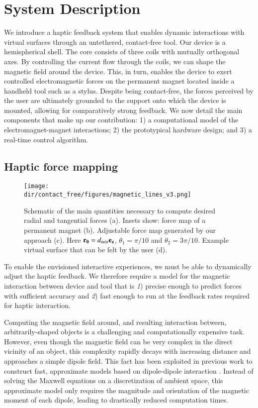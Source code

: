 \section{System Description}

We introduce a haptic feedback system that enables dynamic interactions with virtual surfaces through an untethered, contact-free tool.
Our device is a hemispherical shell. The core consists of three coils with mutually orthogonal axes. By controlling the current flow through the coils, we can shape the magnetic field around the device. This, in turn, enables the device to exert controlled electromagnetic forces on the permanent magnet located inside a handheld tool such as a stylus. Despite being contact-free, the forces perceived by the user are ultimately grounded to the support onto which the device is mounted, allowing for comparatively strong feedback.
We now detail the main components that make up our contribution: 1) a computational model of the electromagnet-magnet interactions; 2) the prototypical hardware design; and 3) a real-time control algorithm.

\subsection{Haptic force mapping}
\begin{figure}[t]
\centering
\medskip
\texttt{[image: \\dir/contact\_free/figures/magnetic\_lines\_v3.png]}
\caption{Schematic of the main quantities necessary to compute desired radial and tangential forces (a). Insets show: force map of a permanent magnet (b). Adjustable force map generated by our approach (c). Here $\mathbf{r_{0}} = d_{min} \mathbf{e_z}$, $\theta_1 = \pi/10$ and $\theta_2 = 3\pi/10$. Example virtual surface that can be felt by the user (d).}
\label{fig:magnetic_model}
\end{figure}{}

To enable the envisioned interactive experiences, we must be able to dynamically adjust the haptic feedback. We therefore require a model for the magnetic interaction between device and tool that is \emph{1}) precise enough to predict forces with sufficient accuracy and \emph{2}) fast enough to run at the feedback rates required for haptic interaction.

Computing the magnetic field around, and resulting interaction between, arbitrarily-shaped objects is a challenging and computationally expensive task. However, even though the magnetic field can be very complex in the direct vicinity of an object, this complexity rapidly decays with increasing distance and approaches a simple dipole field. This fact has been exploited in previous work to construct fast, approximate models based on dipole-dipole interaction \cite{thomaszewski2008magnets}. Instead of solving the Maxwell equations on a discretization of ambient space, this approximate model only requires the magnitude and orientation of the magnetic moment of each dipole, leading to drastically reduced computation times.

